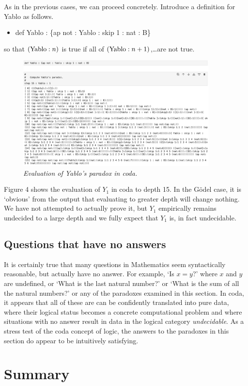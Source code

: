 \documentclass[11pt]{article}
\begin{document}
     As in the previous cases, we can proceed concretely.  Introduce a definition for Yablo as follows.
\begin{itemize}
\item def Yablo : \{ap not : Yablo : skip 1 : nat : B\}
\end{itemize}
so that $({\rm Yablo}:n)$ is true if all of $({\rm Yablo}:n+1)$,\dots are not true.
\begin{figure}[h]
\centering
\includegraphics[width=0.9\textwidth]{Yablo.png}
\caption{{\it Evaluation of Yablo's paradox in coda.}}
\end{figure}
Figure 4 shows the evaluation of $Y_1$ in coda to depth 15.  In the G\"odel case, it is `obvious' from
the output that evaluating to greater depth will change nothing.  We have not attempted to actually
prove it, but $Y_1$ empirically remains undecided to a large depth and we fully expect that
$Y_1$ is, in fact undecidable.
\subsection {Questions that have no answers} 
    It is certainly true that many questions in Mathematics seem syntactically reasonable, but 
actually have no answer.  For example, `Is $x=y$?' where $x$ and $y$ are undefined, or 
`What is the last natural number?' or `What is the sum of all the natural numbers?' or 
any of the paradoxes examined in this section.  In coda, it appears that all of these 
are can be confidently translated into pure data, where their logical status becomes 
a concrete computational problem and where situations with no answer result in data 
in the logical category {\it undecidable}.  As a stress test of the coda concept of logic, 
the answers to the paradoxes in this section do appear to be intuitively satisfying. 

\section{Summary}
\end{document}
